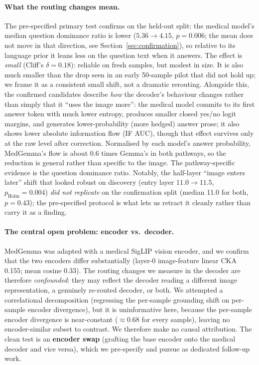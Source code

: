 \paragraph{What the routing changes mean.}
The pre-specified primary test confirms on the held-out split: the medical model's
median question dominance ratio is lower ($5.36 \to 4.15$, $p{=}0.006$; the mean does not
move in that direction, see Section~\ref{sec:confirmation}), so relative to its
language prior it leans less on the question text when it answers. The effect is
\emph{small} (Cliff's $\delta{=}0.18$): reliable on fresh samples, but modest in
size. It is also much smaller than the drop seen in an early 50-sample pilot that did not
hold up; we frame it as a consistent small shift, not a dramatic rerouting. Alongside this, the
confirmed candidates describe \emph{how} the decoder's behaviour changes rather than
simply that it ``uses the image more'': the medical model commits to its first answer
token with much lower entropy, produces smaller closed yes/no logit margins, and
generates lower-probability (more hedged) answer prose; it also shows lower absolute information flow (IF AUC), though that effect survives
only at the raw level after correction. Normalised by each model's answer probability,
MedGemma's flow is about 0.6 times Gemma's in both pathways, so the reduction is general
rather than specific to the image. The pathway-specific evidence is the question
dominance ratio. Notably, the half-layer ``image enters later'' shift
that looked robust on discovery (entry layer $11.0 \to 11.5$, $p_\text{Holm}{=}0.004$)
\emph{did not replicate} on the confirmation split (median 11.0 for both, $p{=}0.43$);
the pre-specified protocol is what lets us retract it cleanly rather than carry it as a finding.

\paragraph{The central open problem: encoder vs.\ decoder.}
MedGemma was adapted with a medical SigLIP vision encoder, and we confirm that the
two encoders differ substantially (layer-0 image-feature linear CKA 0.155; mean
cosine 0.33). The routing changes we measure in the decoder are therefore
\emph{confounded}: they may reflect the decoder reading a different image
representation, a genuinely re-routed decoder, or both. We attempted a correlational
decomposition (regressing the per-sample grounding shift on per-sample encoder
divergence), but it is uninformative here, because the per-sample encoder
divergence is near-constant ($\approx 0.68$ for every sample), leaving no
encoder-similar subset to contrast. We therefore make no causal attribution. The
clean test is an \textbf{encoder swap} (grafting the base encoder onto the medical
decoder and vice versa), which we pre-specify and pursue as dedicated follow-up work.

